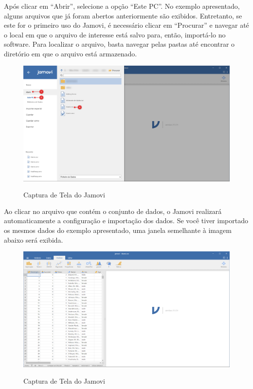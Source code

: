 Após clicar em “Abrir”, selecione a opção “Este PC”. No exemplo apresentado, alguns arquivos que já foram abertos anteriormente são exibidos. Entretanto, se este for o primeiro uso do Jamovi, é necessário clicar em “Procurar” e navegar até o local em que o arquivo de interesse está salvo para, então, importá-lo no software. Para localizar o arquivo, basta navegar pelas pastas até encontrar o diretório em que o arquivo está armazenado.

\begin{figure}[H]
  \centering
  \caption{Captura de Tela do Jamovi}
  \includegraphics[width=\textwidth]{imagens/cap_1/importa_dados_2.png}
  \label{fig:importa_dados_2}
\end{figure}

Ao clicar no arquivo que contém o conjunto de dados, o Jamovi realizará automaticamente a configuração e importação dos dados. Se você tiver importado os mesmos dados do exemplo apresentado, uma janela semelhante à imagem abaixo será exibida.

\begin{figure}[H]
  \centering
  \caption{Captura de Tela do Jamovi}
  \includegraphics[width=\textwidth]{imagens/cap_1/jamovi_arquivo_importado.png}
  \label{fig:jamovi_arquivo_importado}
\end{figure}

